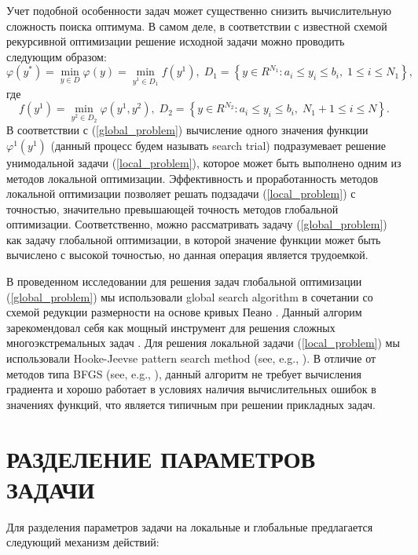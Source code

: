 \documentclass{aip-cp}
\begin{document}
Учет подобной особенности задач может существенно снизить вычислительную сложность поиска оптимума. В самом деле, в соответствии с известной схемой рекурсивной оптимизации \cite{Carr} решение исходной задачи можно проводить следующим образом:
\begin{equation}\label{global_problem}
\varphi(y^*) = \min_{y\in D} \varphi (y) = \min_{y^1\in D_1} f(y^1), \; D_1=\left\{y\in R^{N_1}: a_i\leq y_i \leq b_i, \; 1\leq i \leq N_1\right\},
\end{equation}
где 
\begin{equation}\label{local_problem}
f(y^1) = \min_{ y^2 \in D_2} \varphi(y^1,y^2), \; D_2=\left\{y\in R^{N_2}: a_i\leq y_i \leq b_i, \; N_1+1\leq i \leq N\right\}.
\end{equation}
В соответствии с (\ref{global_problem}) вычисление одного значения функции $\varphi^1 (y^1)$ (данный процесс будем называть search trial) подразумевает решение унимодальной задачи (\ref{local_problem}), которое может быть выполнено одним из методов локальной оптимизации. Эффективность и проработанность методов локальной оптимизации позволяет решать подзадачи (\ref{local_problem}) с точностью, значительно превышающей точность методов глобальной оптимизации. Соответственно, можно рассматривать задачу (\ref{global_problem}) как задачу глобальной оптимизации, в которой значение функции может быть вычислено с высокой точностью, но данная операция является трудоемкой. 

В проведенном исследовании для решения задач глобальной оптимизации (\ref{global_problem}) мы использовали global search algorithm в сочетании со схемой редукции размерности на основе кривых Пеано \cite{Sergeyev2013,Lera2021}. Данный алгорим зарекомендовал себя как мощный инструмент для решения сложных многоэкстремальных задач \cite{Kvasov2013,Kalyulin2017,Cavoretto2021}.
Для решения локальной задачи (\ref{local_problem}) мы использовали Hooke-Jeevse pattern search method (see, e.g., \cite{Kelley}). В отличие от методов типа BFGS (see, e.g., \cite{Nocedal}), данный алгоритм не требует вычисления градиента и хорошо работает в условиях наличия вычислительных ошибок в значениях функций, что является типичным при решении прикладных задач.

\section{РАЗДЕЛЕНИЕ ПАРАМЕТРОВ ЗАДАЧИ}

Для разделения параметров задачи на локальные и глобальные предлагается следующий механизм действий:
\end{document}
